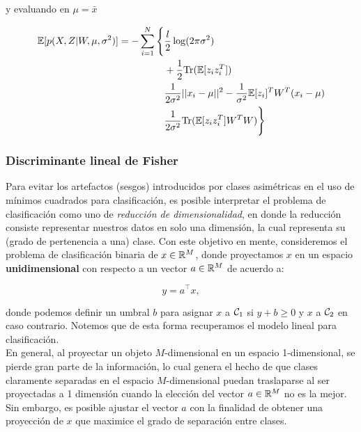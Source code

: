y evaluando en $\mu = \bar{x}$

\begin{align}
\notag \mathbb{E}[ p(X,Z |W, \mu, \sigma^2) ] =  -\sum_{i=1}^N \Bigg\{ &\frac{l}{2} \log (2\pi \sigma^2)\\
\notag & + \frac{1}{2}\text{Tr}(\mathbb{E}[z_iz_i^T])\\
\notag & \frac{1}{2\sigma^2}||x_i - \mu||^2 - \frac{1}{\sigma^2}\mathbb{E}[z_i]^T W^T (x_i - \mu)\\
& \frac{1}{2\sigma^2} \text{Tr}(\mathbb{E}[z_iz_i^T]W^T W) \Bigg\}
\end{align}

\subsubsection{Discriminante lineal de Fisher}

Para evitar los artefactos (sesgos) introducidos por clases  asimétricas en el uso de mínimos cuadrados para clasificación, es posible interpretar el problema de clasificación como uno de \emph{reducción de dimensionalidad}, en donde la reducción consiste representar nuestros datos  en solo una dimensión, la cual representa su (grado de pertenencia a una) clase. Con este objetivo en mente, consideremos el problema de clasificación binaria de $x\in \mathbb{R}^M$, donde proyectamos $x$ en un espacio \textbf{unidimensional} con respecto a un vector $a\in\mathbb{R}^M$ de acuerdo a:

\begin{equation}
	y = a^\top x,
\end{equation}

donde podemos definir un umbral $b$ para asignar $x$ a ${\mathcal C}_1$ si $y+b\geq 0$ y $x$ a ${\mathcal C}_2$ en caso contrario. Notemos que de esta forma recuperamos el modelo lineal para clasificación.\\

En general, al proyectar un objeto $M$-dimensional en un espacio  1-dimensional, se pierde gran parte de la información, lo cual genera el hecho de que clases claramente separadas en el espacio $M$-dimensional puedan traslaparse al ser proyectadas a 1 dimensión cuando la elección del vector $a\in\mathbb{R}^M$ no es la mejor. Sin embargo, es posible ajustar el vector $a$ con la finalidad de obtener una proyección de $x$ que maximice el grado de separación entre clases.\\

